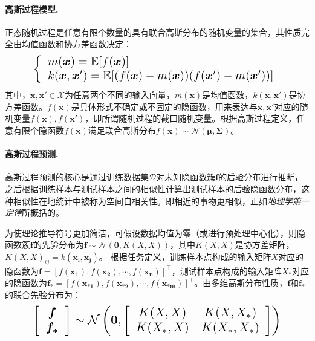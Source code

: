 \documentclass[final]{cvpr}
\newcommand{\mypara}[1]{\paragraph{#1.}}
\begin{document}
\mypara{高斯过程模型}
正态随机过程是任意有限个数量的具有联合高斯分布的随机变量的集合，其性质完全由均值函数和协方差函数决定：
\begin{equation}
    \resizebox{0.85\hsize}{!}{$
    \left\{\begin{array}{l} 
        m(\boldsymbol{x})=\mathbb{E}[f(\boldsymbol{x})] \\  
        k(\boldsymbol{x},\boldsymbol{x}')=\mathbb{E}[(f(\boldsymbol{x})-m(\boldsymbol{x}))(f(\boldsymbol{x}')-m(\boldsymbol{x}'))]
    \end{array}\right.
    $}
\end{equation}
其中，$\boldsymbol{x},\boldsymbol{x}'\in \mathcal{X}$为任意两个不同的输入向量，$m(\boldsymbol{x})$是均值函数，$k(\boldsymbol{x},\boldsymbol{x}')$是协方差函数。$f(\boldsymbol{x})$是具体形式不确定或不固定的隐函数，用来表达与$\boldsymbol{x},\boldsymbol{x'}$对应的随机变量$f(\boldsymbol{x}),f(\boldsymbol{x'})$，即所谓随机过程的截口随机变量\cite{su2020gp}。根据高斯过程定义，任意有限个隐函数$f(\boldsymbol{x})$满足联合高斯分布$f(\boldsymbol{x}) \sim \mathcal{N}(\boldsymbol{\mu},\boldsymbol{\Sigma})$。

\mypara{高斯过程预测}
高斯过程预测的核心是通过训练数据集$\mathcal{D}$对未知隐函数簇$\boldsymbol{f}$的后验分布进行推断，之后根据训练样本与测试样本之间的相似性计算出测试样本的后验隐函数分布，这种相似性在地统计中被称为空间自相关性。即相近的事物更相似，正如\emph{地理学第一定律}\cite{miller2004tobler}所概括的。

为使理论推导符号更加简洁，可假设数据均值为零（或进行预处理中心化），则隐函数簇$\boldsymbol{f}$的先验分布为$\boldsymbol{f}\sim\mathcal{N}(\boldsymbol{0}, {K}({X},{X}))$，其中${K}({X},{X})$是协方差矩阵，${K}({X},{X})_{ij}=k(\boldsymbol{x_{i}},\boldsymbol{x_{j}})$。
根据任务定义，训练样本点构成的输入矩阵${X}$对应的隐函数为$\boldsymbol{f}=[f(\boldsymbol{x_{1}}), f(\boldsymbol{x_{2}}), \cdots, f(\boldsymbol{x_{n}})]^{\top}$，测试样本点构成的输入矩阵${X_{*}}$对应的隐函数为$\boldsymbol{f_{*}}=[f(\boldsymbol{x_{*1}}), f(\boldsymbol{x_{*2}}), \cdots, f(\boldsymbol{x_{*m}})]^{\top}$。由多维高斯分布性质，$\boldsymbol{f}$和$\boldsymbol{f_{*}}$的联合先验分布为：
\begin{equation}
    \resizebox{0.85\hsize}{!}{$
    \left[\begin{array}{c} 
        \boldsymbol{f} \\  
        \boldsymbol{f_{*}}
    \end{array}\right] \sim \mathcal{N}\left(\boldsymbol{0}, \left[\begin{array}{cc} 
        {K}({X},{X}) & {K}({X},{X_{*}}) \\  
        {K}({X_{*}},{X}) & {K}({X_{*}},{X_{*}})
    \end{array}\right]\right)
    $}
\end{equation}
\end{document}
